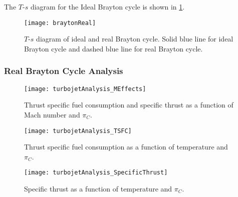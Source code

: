 The $T$-$s$ diagram for the Ideal Brayton cycle is shown in \cref{FIG_IDEAL_BRAYTON}.

\begin{figure}[!htb!]
 \centering
    {\texttt{[image: braytonReal]}}
    \caption{\label{FIG_IDEAL_BRAYTON}$T$-$s$ diagram of ideal and real Brayton cycle. Solid blue line for ideal Brayton cycle and dashed blue line for real Brayton cycle.}
\end{figure}

\subsubsection{Real Brayton Cycle Analysis}

\begin{figure}[!htb!]
 \centering
    {\texttt{[image: turbojetAnalysis\_MEffects]}}
    \caption{\label{FIG_turbojetAnalysis_MEffects}Thrust specific fuel consumption and specific thrust as a function of Mach number and $\pi_C$.}
\end{figure}

\begin{figure}[!htb!]
 \centering
    {\texttt{[image: turbojetAnalysis\_TSFC]}}
    \caption{\label{FIG_turbojetAnalysis_TSFC}Thrust specific fuel consumption as a function of temperature and $\pi_C$.}
\end{figure}

\begin{figure}[!htb!]
 \centering
    {\texttt{[image: turbojetAnalysis\_SpecificThrust]}}
    \caption{\label{FIG_turbojetAnalysis_SpecificThrust}Specific thrust as a function of temperature and $\pi_C$.}
\end{figure}


